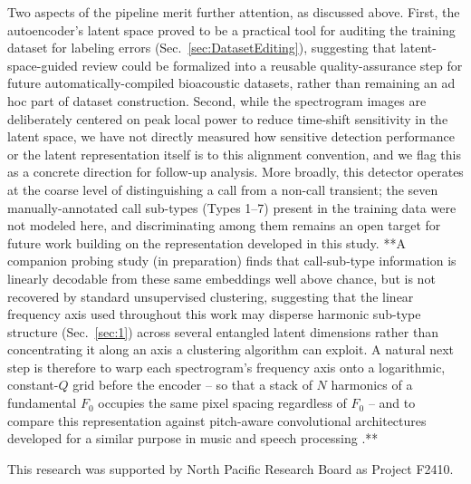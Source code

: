 \documentclass[preprint,NumberedRefs]{JASAnew}
\begin{document}
Two aspects of the pipeline merit further attention, as discussed above.
First, the autoencoder's latent space proved to be a practical tool for
auditing the training dataset for labeling errors (Sec.~\ref{sec:DatasetEditing}),
suggesting that latent-space-guided review could be formalized into a
reusable quality-assurance step for future automatically-compiled bioacoustic
datasets, rather than remaining an ad hoc part of dataset construction.
Second, while the spectrogram images are deliberately centered on peak local
power to reduce time-shift sensitivity in the latent space, we have not
directly measured how sensitive detection performance or the latent
representation itself is to this alignment convention, and we flag this as a
concrete direction for follow-up analysis. More broadly, this detector
operates at the coarse level of distinguishing a call from a non-call
transient; the seven manually-annotated call sub-types (Types 1--7) present
in the training data were not modeled here, and discriminating among them
remains an open target for future work building on the representation
developed in this study. **A companion probing study (in preparation)
finds that call-sub-type information is linearly decodable from these same
embeddings well above chance, but is not recovered by standard unsupervised
clustering, suggesting that the linear frequency axis used throughout this
work may disperse harmonic sub-type structure (Sec.~\ref{sec:1}) across
several entangled latent dimensions rather than concentrating it along an
axis a clustering algorithm can exploit. A natural next step is therefore to
warp each spectrogram's frequency axis onto a logarithmic, constant-$Q$ grid
before the encoder \citep{brown1991calculation} -- so that a stack of $N$
harmonics of a fundamental $F_0$ occupies the same pixel spacing regardless
of $F_0$ -- and to compare this representation against pitch-aware
convolutional architectures developed for a similar purpose in music and
speech processing \citep{kim2018crepe}.**


\begin{acknowledgments}
This research was supported by  North Pacific Research Board as Project F2410. 
\end{acknowledgments}




\end{document}
